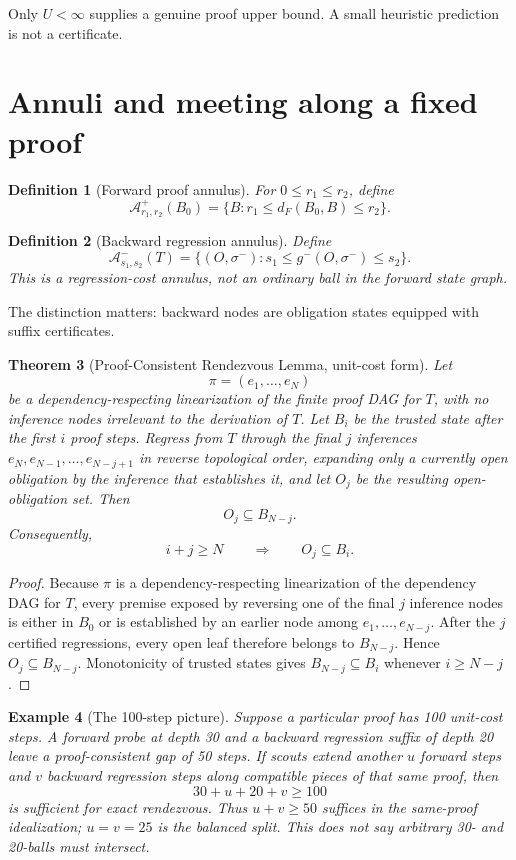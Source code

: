 \documentclass[11pt]{article}
\newtheorem{definition}{Definition}[section]
\newtheorem{theorem}[definition]{Theorem}
\newtheorem{example}[definition]{Example}
\begin{document}
Only $U<\infty$ supplies a genuine proof upper bound. A small heuristic prediction is not a certificate.

\section{Annuli and meeting along a fixed proof}

\begin{definition}[Forward proof annulus]
For $0\le r_1\le r_2$, define
\[
\mathcal A^+_{r_1,r_2}(B_0)=\{B:r_1\le d_F(B_0,B)\le r_2\}.
\]
\end{definition}

\begin{definition}[Backward regression annulus]
Define
\[
\mathcal A^-_{s_1,s_2}(T)
=
\{(O,\sigma^-):s_1\le g^-(O,\sigma^-)\le s_2\}.
\]
This is a regression-cost annulus, not an ordinary ball in the forward state graph.
\end{definition}

The distinction matters: backward nodes are obligation states equipped with suffix certificates.

\begin{theorem}[Proof-Consistent Rendezvous Lemma, unit-cost form]
Let
\[
\pi=(e_1,\ldots,e_N)
\]
be a dependency-respecting linearization of the finite proof DAG for $T$, with no inference nodes irrelevant to the derivation of $T$. Let $B_i$ be the trusted state after the first $i$ proof steps. Regress from $T$ through the final $j$ inferences $e_N,e_{N-1},\ldots,e_{N-j+1}$ in reverse topological order, expanding only a currently open obligation by the inference that establishes it, and let $O_j$ be the resulting open-obligation set. Then
\[
O_j\subseteq B_{N-j}.
\]
Consequently,
\[
i+j\ge N\qquad\Longrightarrow\qquad O_j\subseteq B_i.
\]
\end{theorem}

\begin{proof}
Because $\pi$ is a dependency-respecting linearization of the dependency DAG for $T$, every premise exposed by reversing one of the final $j$ inference nodes is either in $B_0$ or is established by an earlier node among $e_1,\ldots,e_{N-j}$. After the $j$ certified regressions, every open leaf therefore belongs to $B_{N-j}$. Hence $O_j\subseteq B_{N-j}$. Monotonicity of trusted states gives $B_{N-j}\subseteq B_i$ whenever $i\ge N-j$.
\end{proof}

\begin{example}[The 100-step picture]
Suppose a particular proof has 100 unit-cost steps. A forward probe at depth 30 and a backward regression suffix of depth 20 leave a proof-consistent gap of 50 steps. If scouts extend another $u$ forward steps and $v$ backward regression steps along compatible pieces of that same proof, then
\[
30+u+20+v\ge100
\]
is sufficient for exact rendezvous. Thus $u+v\ge50$ suffices in the same-proof idealization; $u=v=25$ is the balanced split. This does \emph{not} say arbitrary 30- and 20-balls must intersect.
\end{example}
\end{document}
